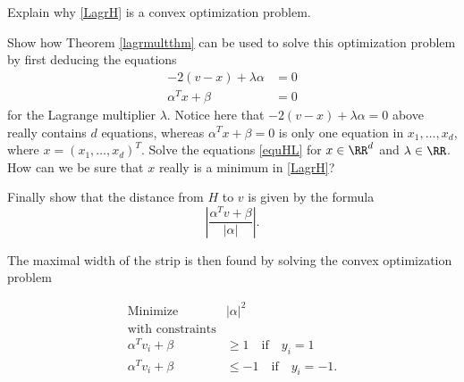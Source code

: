 \documentclass{article}
\begin{document}
  Explain why \eqref{LagrH} is a convex optimization problem.
  
  Show how Theorem \ref{lagrmultthm} can be used to solve this optimization problem by
  first deducing the equations
  \begin{align}\label{equHL}
    -2(v - x) + \lambda \alpha &= 0\\
    \alpha^T x + \beta &= 0
  \end{align}
  for the Lagrange multiplier $\lambda$. Notice here that 
  $-2(v - x) + \lambda \alpha = 0$ above really contains $d$ equations, whereas
  $\alpha^T x + \beta = 0$ is only one equation in $x_1, \dots, x_d$, where
  $x = (x_1, \dots, x_d)^T$. Solve the equations \eqref{equHL} for $x\in \RR^d$ and $\lambda\in \RR$.
  How can we be sure that $x$ really is a minimum in
  \eqref{LagrH}?
  
  Finally show that the distance from $H$ to $v$ is given by the formula
  $$
  \left| \frac{\alpha^T v + \beta}{|\alpha|}\right|.
  $$
  \endshex
  

  The maximal width of the strip is then
  found by solving the convex optimization problem

    \begin{align} \label{sepoptpts}
    \text{Minimize}\qquad\quad &|\alpha|^2\\
     \text{with constraints}&\\
    \alpha^T v_i + \beta &\geq 1\quad\text{if}\quad y_i = 1\\
    \alpha^T v_i + \beta &\leq -1\quad\text{if}\quad y_i = -1.
  \end{align}
\end{document}
